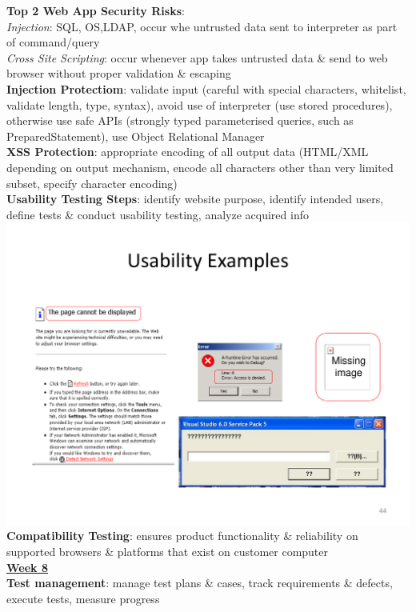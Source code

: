 \documentclass[a4paper]{article}
\begin{document}
\begin{multicols}{3}
        \textbf{Top 2 Web App Security Risks}:\\
        \textit{Injection}: SQL, OS,LDAP, occur whe untrusted data sent to interpreter as part of command/query\\
        \textit{Cross Site Scripting}: occur whenever app takes untrusted data \& send to web browser without proper validation \& escaping\\
        \textbf{Injection Protectiom}: validate input (careful with special characters, whitelist, validate length, type, syntax), avoid use of interpreter (use stored procedures), otherwise use safe APIs (strongly typed parameterised queries, such as PreparedStatement), use Object Relational Manager\\
        \textbf{XSS Protection}: appropriate encoding of all output data (HTML/XML depending on output mechanism, encode all characters other than very limited subset, specify character encoding)\\
        \textbf{Usability Testing Steps}: identify website purpose, identify intended users, define tests \& conduct usability testing, analyze acquired info\\
        \includegraphics[width=\linewidth]{340.pdf}\\
        \textbf{Compatibility Testing}: ensures product functionality \& reliability on supported browsers \& platforms that exist on customer computer\\
        \underline{\textbf{Week 8}}\\
        \textbf{Test management}: manage test plans \& cases, track requirements \& defects, execute tests, measure progress\\

\end{multicols}
\end{document}
